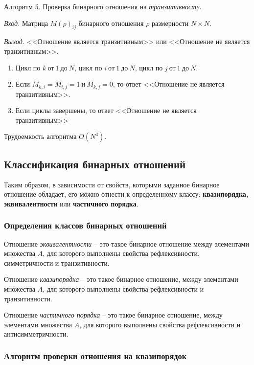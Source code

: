 \documentclass[bachelor, och, labwork]{shiza}
\begin{document}
Алгоритм 5. Проверка бинарного отношения на \textit{транзитивность}.

\textit{Вход.} Матрица $M(\rho)_{ij}$ бинарного отношения $\rho$ размерности
$N \times N$.

\textit{Выход.} <<Отношение является транзитивным>> или <<Отношение не является
транзитивным>>.

\begin{enumerate}
    
    \item Цикл по $k ~\text{от}~ 1 ~\text{до}~ N$, 
    цикл по $i ~\text{от}~ 1 ~\text{до}~ N$, цикл по $j ~\text{от}~ 1 ~\text{до}~ N$.
    
    \item Если $M_{k,i}=M_{i,j}=1 ~\text{и}~ M_{k,j}=0$, то ответ <<Отношение не является
    транзитивным>>.
   
    \item Если циклы завершены, то ответ <<Отношение не является транзитивным>>

\end{enumerate}
Трудоемкость алгоритма $O(N^3)$.

\subsection{Классификация бинарных отношений}

Таким образом, в зависимости от свойств, которыми заданное бинарное отношение
обладает, его можно отнести к определенному классу: \textbf{квазипорядка,
эквивалентности} или \textbf{частичного порядка}. 

\subsubsection{Определения классов бинарных отношений}

Отношение \textit{эквивалентности} -- это такое бинарное отношение между элементами
множества $A$, для которого выполнены свойства рефлексивности, симметричности 
и транзитивности.

Отношение \textit{квазипорядка} -- это такое бинарное отношение, между элементами
множества $A$, для которого выполнены свойства рефлексивности и транзитивности.

Отношение \textit{частичного порядка} -- это такое бинарное отношение, между
элементами множества $A$, для которого выполнены свойства рефлексивности и
антисимметричности.

\subsubsection{Алгоритм проверки отношения на квазипорядок}
\end{document}
